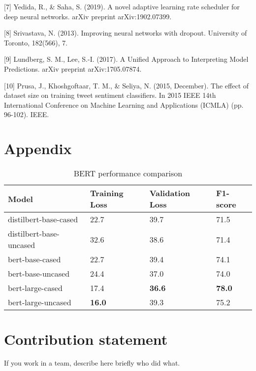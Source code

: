 \documentclass[11pt]{article}
\begin{document}
[7] Yedida, R., \& Saha, S. (2019). A novel adaptive learning rate scheduler for deep neural networks. arXiv preprint arXiv:1902.07399.

[8] Srivastava, N. (2013). Improving neural networks with dropout. University of Toronto, 182(566), 7.

[9] Lundberg, S. M., Lee, S.-I. (2017). A Unified Approach to Interpreting Model Predictions. arXiv preprint arXiv:1705.07874.

[10] Prusa, J., Khoshgoftaar, T. M., \& Seliya, N. (2015, December). The effect of dataset size on training tweet sentiment classifiers. In 2015 IEEE 14th International Conference on Machine Learning and Applications (ICMLA) (pp. 96-102). IEEE.

\section{Appendix}
\begin{table}[htp]
\caption{BERT performance comparison}
\begin{center}
\begin{tabular}{|l|l|l|l|}
\hline
\textbf{Model} & \textbf{Training Loss} & \textbf{Validation Loss} & \textbf{F1-score} \\ \hline
distilbert-base-cased   & 22.7 & 39.7 & 71.5 \\ \hline
distilbert-base-uncased & 32.6 & 38.6 & 71.4 \\ \hline
bert-base-cased         & 22.7 & 39.4 & 74.1 \\ \hline
bert-base-uncased       & 24.4 & 37.0 & 74.0 \\ \hline
bert-large-cased        & 17.4 & \textbf{36.6} & \textbf{78.0} \\ \hline
bert-large-uncased      & \textbf{16.0} & 39.3 & 75.2 \\ \hline
\end{tabular}
\end{center}
\label{default}
\end{table}
\section{Contribution statement}

If you work in a team, describe here briefly who did what.
\end{document}
